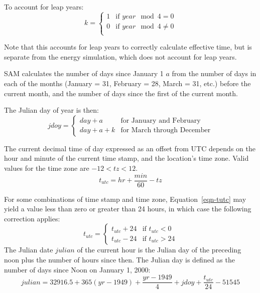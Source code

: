 \documentclass[12pt,letterpaper]{article}
\begin{document}
To account for leap years:
\begin{equation}
k = 
\left\{
   \begin{array}{ll}
      1 & \text{if $\mathit{year}\mod4=0$}\\
      0 & \text{if $\mathit{year}\mod4\neq0$}\\
   \end{array}
\right. 
\end{equation}

Note that this accounts for leap years to correctly calculate effective time, but is separate from the energy simulation, which does not account for leap years.

SAM calculates the number of days since January 1 $a$ from the number of days in each of the months (January = 31, February = 28, March = 31, etc.) before the current month, and the number of days since the first of the current month.

The Julian day of year is then:
\begin{equation}
\mathit{jdoy}= 
\left\{
   \begin{array}{ll}
      \mathit{day} + a & \text{for January and February}\\
      \mathit{day} + a + k & \text{for March through December}
   \end{array}
\right. 
\end{equation}

The current decimal time of day expressed as an offset from UTC depends on the hour and minute of the current time stamp, and the location's time zone. Valid values for the time zone are $-12<\mathit{tz}<12$.
\begin{equation}\label{eqn-tutc}
t_{utc} = \mathit{hr} + \frac{\mathit{min}}{60} - \mathit{tz}
\end{equation}

For some combinations of time stamp and time zone, Equation~\ref{eqn-tutc} may yield a value less than zero or greater than 24 hours, in which case the following correction applies:
\begin{equation}
t_{utc} = \left\{
   \begin{array}{ll}
       t_{utc} + 24 & 
      \text{if $t_{utc}<0$}\\
      t_{utc} - 24 & 
      \text{if $t_{utc}>24$}
   \end{array}
\right. 
\end{equation}
The Julian date $\mathit{julian}$ of the current hour is the Julian day of the preceding noon plus the number of hours since then. The Julian day is defined as the number of days since Noon on January 1, 2000:
\begin{equation}\label{eqn-jday}
\mathit{julian} = 32916.5 + 365(\mathit{yr}-1949) + \frac{\mathit{yr}-1949}{4} + \mathit{jdoy} + \frac{t_{utc}}{24} - 51545
\end{equation}
\end{document}
